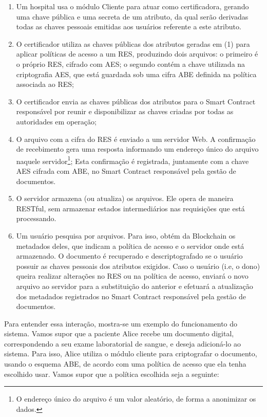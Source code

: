 \documentclass[a4paper,11pt]{article}
\begin{document}
\begin{enumerate}[label=(\arabic*)]
  \item Um hospital usa o módulo Cliente para atuar como certificadora, gerando uma chave pública e uma secreta de um atributo, da qual serão derivadas todas as chaves pessoais emitidas aos usuários referente a este atributo.
  \item O certificador utiliza as chaves públicas dos atributos geradas em (1) para aplicar políticas de acesso a um RES, produzindo dois arquivos:
  o primeiro é o próprio RES, cifrado com AES; o segundo contém a chave utilizada na criptografia AES, que está guardada sob uma cifra ABE definida na política associada ao RES;%
  \item O certificador envia as chaves públicas dos atributos para o Smart Contract responsável por reunir e disponibilizar as chaves criadas por todas as autoridades em operação;
  \item O arquivo com a cifra do RES é enviado a um servidor Web.
  A confirmação de recebimento gera uma resposta informando um endereço único do arquivo naquele servidor\footnote{O endereço único do arquivo é um valor aleatório, de forma a anonimizar os dados.};
  Esta confirmação é registrada, juntamente com a chave AES cifrada com ABE, no Smart Contract responsável pela gestão de documentos.
  \item O servidor armazena (ou atualiza) os arquivos. Ele opera de maneira RESTful, sem armazenar estados intermediários nas requisições que está processando.
  \item Um usuário pesquisa por arquivos. Para isso, obtém da Blockchain os metadados deles, que indicam a política de acesso e o servidor onde está armazenado.
  O documento é recuperado e descriptografado se o usuário possuir as chaves pessoais dos atributos exigidos.
  Caso o usuário (i.e, o dono) queira realizar alterações no RES ou na política de acesso, enviará o novo arquivo ao servidor para a substituição do anterior e efetuará a atualização dos metadados registrados no Smart Contract responsável pela gestão de documentos.
\end{enumerate}

Para entender essa interação, mostra-se um exemplo do funcionamento do sistema.
Vamos supor que a paciente Alice recebe um documento digital, correspondendo a seu exame laboratorial de sangue, e deseja adicioná-lo ao sistema.
Para isso, Alice utiliza o módulo cliente para criptografar o documento, usando o esquema ABE, de acordo com uma política de acesso que ela tenha escolhido usar.
Vamos supor que a política escolhida seja a seguinte:
\end{document}
